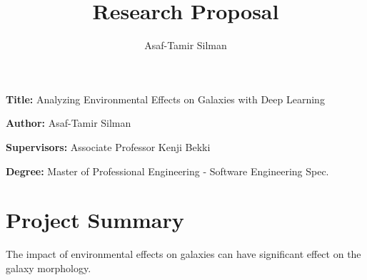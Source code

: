\documentclass[12pt, a4paper]{article}
\title{Research Proposal}
\author{Asaf-Tamir Silman}
\date{}
\newcommand{\namelistlabel}[1]{\mbox{#1}\hfil}
\newenvironment{namelist}[1]{%
\begin{list}{}
    {
        \let\makelabel\namelistlabel
        \settowidth{\labelwidth}{#1}
        \setlength{\leftmargin}{1.1\labelwidth}
    }
  }{%
\end{list}}
\begin{document}
\maketitle

\begin{namelist}{xxxxxxxxxxxx}
    \item[{\bf Title:}]
        Analyzing Environmental Effects on Galaxies with Deep Learning
    \item[{\bf Author:}]
        Asaf-Tamir Silman
    \item[{\bf Supervisors:}]
        Associate Professor Kenji Bekki
    \item[{\bf Degree:}]
        Master of Professional Engineering - Software Engineering Spec.
    \end{namelist}

\section{Project Summary}
The impact of environmental effects on galaxies can have significant
effect on the galaxy morphology. 
\end{document}
